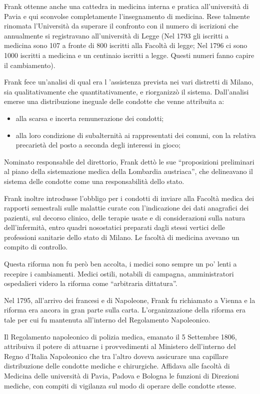 \documentclass[]{article}
\begin{document}
Frank ottenne anche una cattedra in medicina interna e pratica
all'università di Pavia e qui sconvolse completamente l'insegnamento di
medicina. Rese talmente rinomata l'Università da superare il confronto
con il numero di iscrizioni che annualmente si registravano
all'università di Legge (Nel 1793 gli iscritti a medicina sono 107 a
fronte di 800 iscritti alla Facoltà di legge; Nel 1796 ci sono 1000
iscritti a medicina e un centinaio iscritti a legge. Questi numeri fanno
capire il cambiamento).

Frank fece un'analisi di qual era l 'assistenza prevista nei vari
distretti di Milano, sia qualitativamente che quantitativamente, e
riorganizzò il sistema. Dall'analisi emerse una distribuzione ineguale
delle condotte che venne attribuita a:

\begin{itemize}
\item
  alla scarsa e incerta remunerazione dei condotti;
\item
  alla loro condizione di subalternità ai rappresentati dei comuni, con
  la relativa precarietà del posto a seconda degli interessi in gioco;
\end{itemize}

Nominato responsabile del direttorio, Frank dettò le sue ``proposizioni
preliminari al piano della sistemazione medica della Lombardia
austriaca'', che delineavano il sistema delle condotte come una
responsabilità dello stato.

Frank inoltre introdusse l'obbligo per i condotti di inviare alla
Facoltà medica dei rapporti semestrali sulle malattie curate con
l'indicazione dei dati anagrafici dei pazienti, sul decorso clinico,
delle terapie usate e di considerazioni sulla natura dell'infermità,
entro quadri nosostatici preparati dagli stessi vertici delle
professioni sanitarie dello stato di Milano. Le facoltà di medicina
avevano un compito di controllo.

Questa riforma non fu però ben accolta, i medici sono sempre un po'
lenti a recepire i cambiamenti. Medici ostili, notabili di campagna,
amministratori ospedalieri videro la riforma come ``arbitraria
dittatura''.

Nel 1795, all'arrivo dei francesi e di Napoleone, Frank fu richiamato a
Vienna e la riforma era ancora in gran parte sulla carta.
L'organizzazione della riforma era tale per cui fu mantenuta all'interno
del Regolamento Napoleonico.

Il Regolamento napoleonico di polizia medica, emanato il 5 Settembre
1806, attribuiva il potere di attuarne i provvedimenti al Ministero
dell'interno del Regno d'Italia Napoleonico che tra l'altro doveva
assicurare una capillare distribuzione delle condotte mediche e
chirurgiche. Affidava alle facoltà di Medicina delle università di
Pavia, Padova e Bologna le funzioni di Direzioni mediche, con compiti di
vigilanza sul modo di operare delle condotte stesse.
\end{document}
